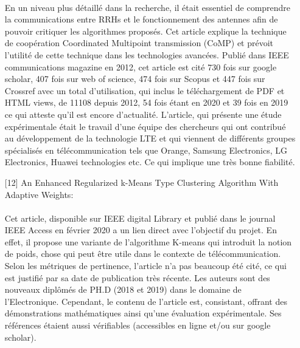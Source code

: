 \documentclass{article}
\begin{document}
\begin{itemize}
  \paragraph{}
  En un niveau plus détaillé dans la recherche, il était essentiel de comprendre la communications 
  entre RRHs et le fonctionnement des antennes afin de pouvoir critiquer les algorithmes proposés. Cet article 
  explique la technique de coopération Coordinated Multipoint transmission (CoMP) et prévoit l'utilité 
  de cette technique dans les technologies avancées. Publié dans IEEE communications magazine en 2012, 
  cet article est cité 730 fois sur google scholar, 407 fois sur web of science, 474 fois sur Scopus et 447 fois 
  sur Crossref avec un total d'utilisation, qui inclus le téléchargement de PDF et HTML views, de 11108 depuis 
  2012, 54 fois étant en 2020 et 39 fois en 2019 ce qui atteste qu'il est encore d'actualité. L'article,
   qui présente une étude expérimentale était le travail d'une équipe des chercheurs qui ont contribué au
   développement de la technologie LTE et qui viennent de différents groupes spécialisés en télécommunication tels que 
   Orange, Samsung Electronics, LG Electronics, Huawei technologies etc. Ce qui implique une très bonne fiabilité.
  
   \item [{[12]}] An Enhanced Regularized k-Means Type Clustering Algorithm With Adaptive Weights:
   \paragraph{}
  Cet article, disponible sur IEEE digital Library et publié dans le journal IEEE Access en février 2020
  a un lien direct avec l'objectif du projet. En effet, il propose une variante de l'algorithme K-means qui introduit
   la notion de poids, chose qui peut être utile dans le contexte de télécommunication. Selon les métriques de 
   pertinence, l'article n'a pas beaucoup été cité, ce qui est justifié par sa date de publication très récente. Les auteurs 
   sont des nouveaux diplômés de PH.D (2018 et 2019) dans le domaine de l'Electronique. Cependant, le contenu 
   de l'article est, consistant, offrant des démonstrations mathématiques ainsi qu'une évaluation 
   expérimentale. Ses références étaient aussi vérifiables (accessibles en ligne et/ou sur google scholar).

   \begin{center}

\end{center}
\end{itemize}
\end{document}
